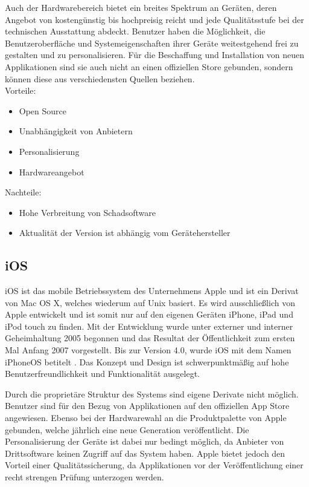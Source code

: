 Auch der Hardwarebereich bietet ein breites Spektrum an Geräten, deren Angebot von kostengünstig bis hochpreisig reicht und jede Qualitätsstufe bei der technischen Ausstattung abdeckt. Benutzer haben die Möglichkeit, die Benutzeroberfläche und Systemeigenschaften ihrer Geräte weitestgehend frei zu gestalten und zu personalisieren. Für die Beschaffung und Installation von neuen Applikationen sind sie auch nicht an einen offiziellen Store gebunden, sondern können diese aus verschiedensten Quellen beziehen.
\\

Vorteile:
\begin{itemize}
	\item Open Source
	\item Unabhängigkeit von Anbietern
	\item Personalisierung
	\item Hardwareangebot
\end{itemize}

Nachteile:
\begin{itemize}
	\item Hohe Verbreitung von Schadsoftware
	\item Aktualität der Version ist abhängig vom Gerätehersteller
\end{itemize}

\subsection{iOS}
iOS ist das mobile Betriebssystem des Unternehmens Apple und ist ein Derivat von Mac OS X, welches wiederum auf Unix basiert. Es wird ausschließlich von Apple entwickelt und ist somit nur auf den eigenen Geräten iPhone, iPad und iPod touch zu finden. Mit der Entwicklung wurde unter externer und interner Geheimhaltung 2005 begonnen und das Resultat der Öffentlichkeit zum ersten Mal Anfang 2007 vorgestellt. Bis zur Version 4.0, wurde iOS mit dem Namen iPhoneOS betitelt \citep{apple_ios}. Das Konzept und Design ist schwerpunktmäßig auf hohe Benutzerfreundlichkeit und Funktionalität ausgelegt. 

Durch die proprietäre Struktur des Systems sind eigene Derivate nicht möglich. Benutzer sind für den Bezug von Applikationen auf den offiziellen App Store angewiesen.
Ebenso bei der Hardwarewahl an die Produktpalette von Apple gebunden, welche jährlich eine neue Generation veröffentlicht. Die Personalisierung der Geräte ist dabei nur bedingt möglich, da Anbieter von Drittsoftware keinen Zugriff auf das System haben. Apple bietet jedoch den Vorteil einer Qualitätssicherung, da Applikationen vor der Veröffentlichung einer recht strengen Prüfung unterzogen werden.
\\

